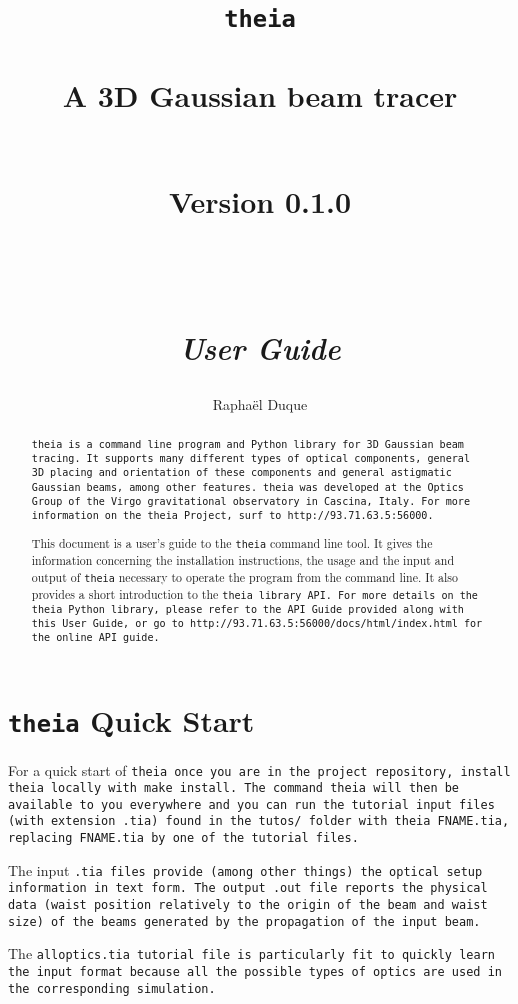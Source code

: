 \documentclass{article}
\title{\texttt{theia} \\ \quad \\A 3D Gaussian beam tracer \\ \quad \\ \begin{small} Version 0.1.0 \end{small} \\ \quad \\ \textit{User Guide}}
\author{Rapha\"el Duque}
\begin{document}
\maketitle

\begin{abstract}
\tt{theia} is a command line program and Python library for 3D Gaussian beam tracing. It supports many different types of optical components, general 3D placing and orientation of these components and general astigmatic Gaussian beams, among other features. \tt{theia} was developed at the Optics Group of the Virgo gravitational observatory in Cascina, Italy. For more information on the theia Project, surf to \tt{http://93.71.63.5:56000}.

This document is a user's guide to the \texttt{theia} command line tool. It gives the information concerning the installation instructions, the usage and the input and output of \texttt{theia} necessary to operate the program from the command line. It also provides a short introduction to the \tt{theia} library API. For more details on the \texttt{theia} Python library, please refer to the API Guide provided along with this User Guide, or go to \tt{http://93.71.63.5:56000/docs/html/index.html} for the online API guide.
\end{abstract}


\tableofcontents
\newpage


\section{\texttt{theia} Quick Start}
For a quick start of \tt{theia} once you are in the project repository, install \tt{theia} locally with \texttt{make install}. The command \tt{theia} will then be available to you everywhere and  you can run the tutorial input files (with extension \texttt{.tia}) found in the \tt{tutos/} folder with \texttt{theia FNAME.tia}, replacing \texttt{FNAME.tia} by one of the tutorial files.

The input \tt{.tia} files provide (among other things) the optical setup information in text form. The output \tt{.out} file reports the physical data (waist position relatively to the origin of the beam and waist size) of the beams generated by the propagation of the input beam.

The \tt{alloptics.tia} tutorial file is particularly fit to quickly learn the input format because all the possible types of optics are used in the corresponding simulation. 
\end{document}
